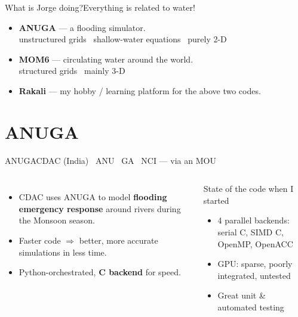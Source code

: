 \documentclass[aspectratio=169]{beamer}
\newcommand{\cplx}[1]{{\footnotesize\color{cookieMuted}#1}}
\begin{document}
\begin{frame}{What is Jorge doing?}{Everything is related to water!}
  \begin{itemize}\setlength\itemsep{6pt}
    \item \textbf{ANUGA} --- a flooding simulator. \\ \cplx{unstructured grids \textperiodcentered\ shallow-water equations \textperiodcentered\ purely 2-D}
    \item \textbf{MOM6} --- circulating water around the world. \\ \cplx{structured grids \textperiodcentered\ mainly 3-D}
    \item \textbf{Rakali} --- my hobby / learning platform for the above two codes.
  \end{itemize}
\end{frame}

\section{ANUGA}

\begin{frame}{ANUGA}{CDAC (India) \textperiodcentered\ ANU \textperiodcentered\ GA \textperiodcentered\ NCI --- via an MOU}
  \begin{columns}[T,onlytextwidth]
      \begin{itemize}
        \item CDAC uses ANUGA to model \textbf{flooding emergency response} around rivers during the Monsoon season.
        \item Faster code $\Rightarrow$ better, more accurate simulations in less time.
        \item Python-orchestrated, \textbf{C backend} for speed.
      \end{itemize}
      \begin{block}{State of the code when I started}
        \begin{itemize}
          \item 4 parallel backends: serial C, SIMD C, OpenMP, OpenACC
          \item GPU: sparse, poorly integrated, untested
          \item Great unit \& automated testing
        \end{itemize}
      \end{block}
  \end{columns}
\end{frame}
\end{document}
